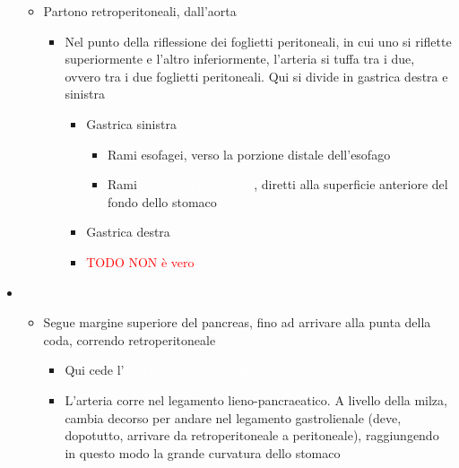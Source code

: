 \documentclass[italian,]{article}
\providecommand{\tightlist}{%
  \setlength{\itemsep}{0pt}\setlength{\parskip}{0pt}}
\newcommand{\art}[1]{\colorbox{RedOrange}{\textcolor{white}{\textsc{#1}}}}
\newcommand{\TODO}[1]{\textcolor{red}{\textsf{\footnotesize{TODO #1}}}} %
\begin{document}
\begin{itemize}
  \begin{itemize}
  \tightlist
  \item
    Partono retroperitoneali, dall'aorta

    \begin{itemize}
    \tightlist
    \item
      Nel punto della riflessione dei foglietti peritoneali, in cui uno
      si riflette superiormente e l'altro inferiormente, l'arteria si
      tuffa tra i due, ovvero tra i due foglietti peritoneali. Qui si
      divide in gastrica destra e sinistra

      \begin{itemize}
      \item
        Gastrica sinistra

        \begin{itemize}
        \tightlist
        \item
          Rami esofagei, verso la porzione distale dell'esofago
        \item
          Rami \art{anteriori del fondo}, diretti alla superficie
          anteriore del fondo dello stomaco
        \end{itemize}
      \item
        Gastrica destra
      \item
        \TODO{NON è vero}
      \end{itemize}
    \end{itemize}
  \end{itemize}
\item
  \art{lienale}

  \begin{itemize}
  \tightlist
  \item
    Segue margine superiore del pancreas, fino ad arrivare alla punta
    della coda, correndo retroperitoneale

    \begin{itemize}
    \tightlist
    \item
      Qui cede l'\art{arteria gastroepiploica sinistra}
    \item
      L'arteria corre nel legamento lieno-pancraeatico. A livello della
      milza, cambia decorso per andare nel legamento gastrolienale
      (deve, dopotutto, arrivare da retroperitoneale a peritoneale),
      raggiungendo in questo modo la grande curvatura dello stomaco
    \end{itemize}
  \end{itemize}
\end{itemize}
\end{document}
